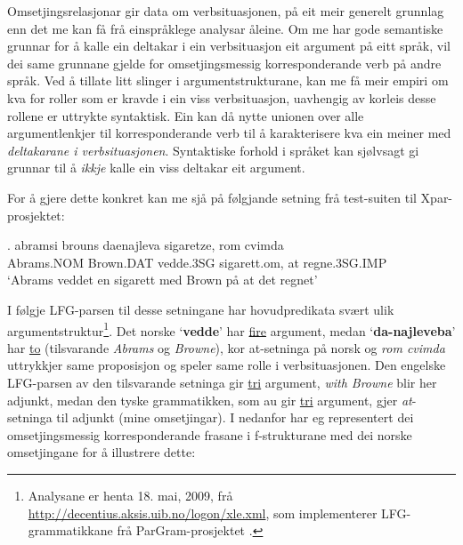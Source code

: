 \documentclass[12pt,a4paper,oneside,draft]{report}
\newcommand{\p}[1]{`\textbf{#1}'}
\begin{document}
Omsetjingsrelasjonar gir data om verbsituasjonen, på eit meir generelt
 grunnlag enn det me kan få frå einspråklege analysar åleine. Om me
 har gode semantiske grunnar for å kalle ein deltakar i ein
 verbsituasjon eit argument på eitt språk, vil dei same grunnane
 gjelde for omsetjingsmessig korresponderande verb på andre språk.
 Ved å tillate litt slinger i argumentstrukturane, kan me få meir
 empiri om kva for roller som er kravde i ein viss verbsituasjon,
 uavhengig av korleis desse rollene er uttrykte syntaktisk.  Ein kan
 då nytte unionen over alle argumentlenkjer til korresponderande verb
 til å karakterisere kva ein meiner med \emph{deltakarane i  verbsituasjonen}. Syntaktiske forhold i språket kan sjølvsagt gi
 grunnar til å \emph{ikkje} kalle ein viss deltakar eit argument.

For å gjere dette konkret kan me sjå på følgjande setning frå
 test-suiten til Xpar-prosjektet:

\exg. abramsi brouns       daenajleva sigaretze, rom cvimda \label{ex:vedde-gloss} \\
      Abrams.NOM Brown.DAT vedde.3SG sigarett.om, at  regne.3SG.IMP \\
     `Abrams veddet en sigarett med Brown på at det regnet' 


I følgje LFG-parsen til desse setningane har hovudpredikata svært ulik
 argumentstruktur\footnote{Analysane er henta 18. mai, 2009, frå
        \href{http://decentius.aksis.uib.no/logon/xle.xml}{http://decentius.aksis.uib.no/logon/xle.xml}, som implementerer
        LFG-grammatikkane frå ParGram-prosjektet \citep{butt2002pgp}. }.  Det norske \p{vedde} har \underline{fire} argument,
 medan \p{da-najleveba} har \underline{to} (tilsvarande \emph{Abrams} og \emph{Browne}),
 kor at-setninga på norsk og \emph{rom cvimda} uttrykkjer same proposisjon
 og speler same rolle i verbsituasjonen. Den engelske LFG-parsen av
 den tilsvarande setninga gir \underline{tri} argument, \emph{with Browne} blir her
 adjunkt, medan den tyske grammatikken, som au gir \underline{tri} argument,
 gjer \emph{at}-setninga til adjunkt (mine omsetjingar). I \Next nedanfor
 har eg representert dei omsetjingsmessig korresponderande frasane i
 f\hyp{}strukturane med dei norske omsetjingane for å illustrere
 dette:
\end{document}
